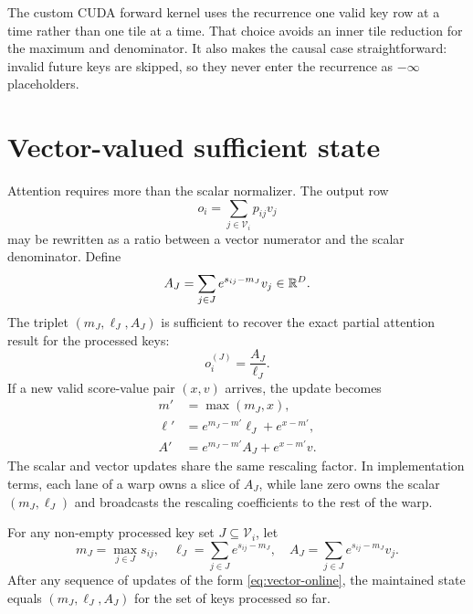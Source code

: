 The custom CUDA forward kernel uses the recurrence one valid key row at a time rather than one tile at a time. That choice avoids an inner tile reduction for the maximum and denominator. It also makes the causal case straightforward: invalid future keys are skipped, so they never enter the recurrence as $-\infty$ placeholders.

\section{Vector-valued sufficient state}

Attention requires more than the scalar normalizer. The output row
\begin{equation}
  o_i = \sum_{j\in\mathcal V_i} p_{ij} v_j
\end{equation}
may be rewritten as a ratio between a vector numerator and the scalar denominator. Define
\begin{equation}
  A_J = \sum_{j\in J} e^{s_{ij}-m_J} v_j \in \mathbb{R}^D.
\end{equation}
The triplet $(m_J,\ell_J,A_J)$ is sufficient to recover the exact partial attention result for the processed keys:
\begin{equation}
  o_i^{(J)} = \frac{A_J}{\ell_J}.
\end{equation}
If a new valid score-value pair $(x,v)$ arrives, the update becomes
\begin{align}
  m' &= \max(m_J, x), \\
  \ell' &= e^{m_J-m'} \ell_J + e^{x-m'}, \\
  A' &= e^{m_J-m'} A_J + e^{x-m'} v.
  \label{eq:vector-online}
\end{align}
The scalar and vector updates share the same rescaling factor. In implementation terms, each lane of a warp owns a slice of $A_J$, while lane zero owns the scalar $(m_J,\ell_J)$ and broadcasts the rescaling coefficients to the rest of the warp.

\begin{invariant}
For any non-empty processed key set $J \subseteq \mathcal V_i$, let
\begin{equation*}
  m_J = \max_{j\in J} s_{ij},\quad
  \ell_J = \sum_{j\in J} e^{s_{ij}-m_J},\quad
  A_J = \sum_{j\in J} e^{s_{ij}-m_J} v_j.
\end{equation*}
After any sequence of updates of the form \eqref{eq:vector-online}, the maintained state equals $(m_J,\ell_J,A_J)$ for the set of keys processed so far.
\end{invariant}

